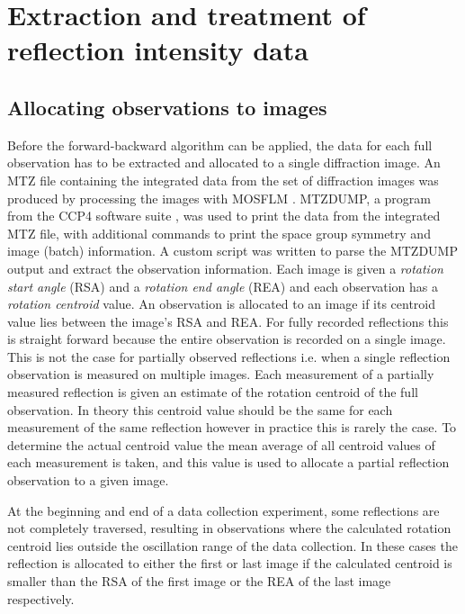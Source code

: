 \section{Extraction and treatment of reflection intensity data}
\label{sec:Extraction and treatment of reflection intensity data}

\subsection{Allocating observations to images}
\label{sub:Allocating observations to images}
Before the forward-backward algorithm can be applied, the data for each full observation has to be extracted and allocated to a single diffraction image.
An MTZ file containing the integrated data from the set of diffraction images was produced by processing the images with MOSFLM \cite{leslie2007}.
MTZDUMP, a program from the CCP4 software suite \cite{winn2011}, was used to print the data from the integrated MTZ file, with additional commands to print the space group symmetry and image (batch) information.
A custom script was written to parse the MTZDUMP output and extract the observation information.
Each image is given a \textit{rotation start angle} (RSA) and a \textit{rotation end angle} (REA) and each observation has a \textit{rotation centroid} value.
An observation is allocated to an image if its centroid value lies between the image's RSA and REA.
For fully recorded reflections this is straight forward because the entire observation is recorded on a single image.
This is not the case for partially observed reflections i.e. when a single reflection observation is measured on multiple images.
Each measurement of a partially measured reflection is given an estimate of the rotation centroid of the full observation.
In theory this centroid value should be the same for each measurement of the same reflection however in practice this is rarely the case.
To determine the actual centroid value the mean average of all centroid values of each measurement is taken, and this value is used to allocate a partial reflection observation to a given image.

At the beginning and end of a data collection experiment, some reflections are not completely traversed, resulting in observations where the calculated rotation centroid lies outside the oscillation range of the data collection.
In these cases the reflection is allocated to either the first or last image if the calculated centroid is smaller than the RSA of the first image or the REA of the last image respectively.


